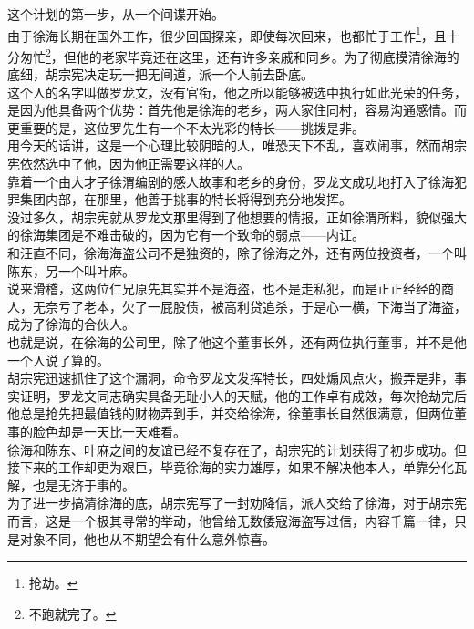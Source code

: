 \begin{multicols}{\theparacolNo}
这个计划的第一步，从一个间谍开始。\\

由于徐海长期在国外工作，很少回国探亲，即使每次回来，也都忙于工作\footnote{抢劫。}，且十分匆忙\footnote{不跑就完了。}，但他的老家毕竟还在这里，还有许多亲戚和同乡。为了彻底摸清徐海的底细，胡宗宪决定玩一把无间道，派一个人前去卧底。\\

这个人的名字叫做罗龙文，没有官衔，他之所以能够被选中执行如此光荣的任务，是因为他具备两个优势：首先他是徐海的老乡，两人家住同村，容易沟通感情。而更重要的是，这位罗先生有一个不太光彩的特长——挑拨是非。\\

用今天的话讲，这是一个心理比较阴暗的人，唯恐天下不乱，喜欢闹事，然而胡宗宪依然选中了他，因为他正需要这样的人。\\

靠着一个由大才子徐渭编剧的感人故事和老乡的身份，罗龙文成功地打入了徐海犯罪集团内部，在那里，他善于挑事的特长将得到充分地发挥。\\

没过多久，胡宗宪就从罗龙文那里得到了他想要的情报，正如徐渭所料，貌似强大的徐海集团是不难击破的，因为它有一个致命的弱点——内讧。\\

和汪直不同，徐海海盗公司不是独资的，除了徐海之外，还有两位投资者，一个叫陈东，另一个叫叶麻。\\

说来滑稽，这两位仁兄原先其实并不是海盗，也不是走私犯，而是正正经经的商人，无奈亏了老本，欠了一屁股债，被高利贷追杀，于是心一横，下海当了海盗，成为了徐海的合伙人。\\

也就是说，在徐海的公司里，除了他这个董事长外，还有两位执行董事，并不是他一个人说了算的。\\

胡宗宪迅速抓住了这个漏洞，命令罗龙文发挥特长，四处煽风点火，搬弄是非，事实证明，罗龙文同志确实具备无耻小人的天赋，他的工作卓有成效，每次抢劫完后他总是抢先把最值钱的财物弄到手，并交给徐海，徐董事长自然很满意，但两位董事的脸色却是一天比一天难看。\\

徐海和陈东、叶麻之间的友谊已经不复存在了，胡宗宪的计划获得了初步成功。但接下来的工作却更为艰巨，毕竟徐海的实力雄厚，如果不解决他本人，单靠分化瓦解，也是无济于事的。\\

为了进一步搞清徐海的底，胡宗宪写了一封劝降信，派人交给了徐海，对于胡宗宪而言，这是一个极其寻常的举动，他曾给无数倭寇海盗写过信，内容千篇一律，只是对象不同，他也从不期望会有什么意外惊喜。\\


\end{multicols}
